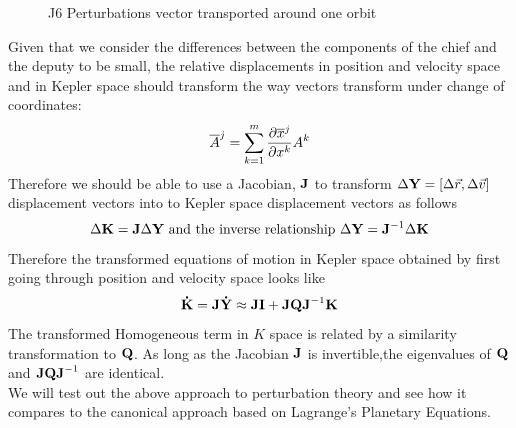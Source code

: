 \begin{figure}[hptp]
\begin{center}
   \caption{J6 Perturbations vector transported around one orbit}
   \label{fig:J6Perturbations} 
\end{center}
\end{figure}

Given that we consider the differences between the components of the chief and the deputy to be small, the relative displacements in position and velocity space and in Kepler space should transform the way vectors transform under
change of coordinates:$$\overline{A}^j = \sum_{k=1}^m{\partial \overline{x}^j\over \partial x^k}A^k$$%
Therefore we should be able to use a Jacobian, $\bf J$ to transform $\Delta{\bf Y} = [\hbox{$\Delta\vec{r}$}, \hbox{$\Delta\vec{v}$} ]$ displacement vectors into to Kepler space displacement vectors as follows
$$\Delta {\bf K} = {\bf J}\Delta {\bf Y} \hbox{  and the inverse relationship  } \Delta {\bf Y} = {\bf J}^{-1} \Delta {\bf K}$$Therefore the transformed equations of motion in Kepler space obtained by first going through position and velocity space looks like
$$ {\bf \dot K} = {\bf J} {\bf \dot Y} \approx {\bf J}{\bf I} + {\bf J Q J}^{-1}{\bf K}$$The transformed Homogeneous term in $K$ space is related by a similarity transformation to $\bf Q$. As long as the Jacobian $\bf J$ is invertible,the eigenvalues of $\bf Q$ and ${\bf JQJ}^{-1}$ are identical.\\

We will test out the above approach to perturbation theory and see how it compares to the canonical approach based on Lagrange's Planetary Equations. 


